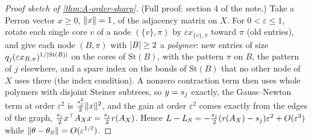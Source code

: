 \begin{proof}[Proof sketch of \cref{thm:A-order-sharp}]
  (Full proof: section 4 of the note.) Take a Perron vector $x\ge0$, $\lVert x\rVert=1$, of the adjacency matrix on
  $X$. For $0<\varepsilon\le1$, rotate each single core $v$ of a node $(\{v\},\pi)$ by $\varepsilon x_{\{v\},\pi}$ toward $\pi$
  (old entries), and give each node $(B,\pi)$ with $\lvert B\rvert\ge2$ a \emph{polymer}: new entries of size
  $q_j(\varepsilon x_{B,\pi})^{1/\lvert\mathrm{St}(B)\rvert}$ on the cores of $\mathrm{St}(B)$, with the pattern $\pi$ on $B$, the
  pattern of $j$ elsewhere, and a spare index on the bonds of $\mathrm{St}(B)$ that no other node of $X$
  uses there (the index condition). A nonzero contraction term then uses whole polymers with disjoint
  Steiner subtrees, so $y=s_{j}$ exactly, the Gauss--Newton term at order $\varepsilon^2$ is
  $\tfrac{s_{j}^2}{2}\lVert x\rVert^2$, and the gain at order $\varepsilon^2$ comes exactly from the edges of the graph,
  $\tfrac{s_{j}}2x^{\top} A_Xx=\tfrac{s_{j}}2r(A_X)$. Hence
  $L-L_S=-\tfrac{s_{j}}2(r(A_X)-s_{j})\varepsilon^2+O(\varepsilon^3)$ while
  $\lVert\theta-\theta_S\rVert=O(\varepsilon^{1/\ell})$.
\end{proof}

